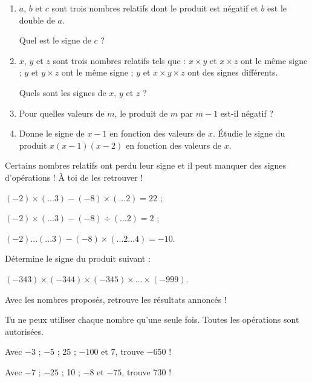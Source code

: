 \begin{enigme}
\begin{enumerate}
    \item $a$, $b$ et $c$ sont trois nombres relatifs dont le produit est négatif et $b$ est le double de $a$.
    
    Quel est le signe de $c$ ?
    \item $x$, $y$ et $z$ sont trois nombres relatifs tels que :
		$x \times y$ et $x \times z$ ont le même signe ;
		$y$ et $y \times z$ ont le même signe ;
		$y$ et $x \times y \times z$ ont des signes différents.
		
	Quels sont les signes de $x$, $y$ et $z$ ?
	\item Pour quelles valeurs de $m$, le produit de $m$ par $m -1$ est-il négatif ?
	\item Donne le signe de $x -1$ en fonction des valeurs de $x$.
Étudie le signe du produit $x(x -1)(x -2)$ en fonction des valeurs de $x$.
\end{enumerate}
\end{enigme}

\vspace{2em}

\begin{enigme}
Certains nombres relatifs ont perdu leur signe et il peut manquer des signes d'opérations ! À toi de les retrouver !

$(-2) \times (... 3) -(-8) \times (... 2) = 22$ ;

$(-2) \times (... 3) -(-8) \div (... 2) = 2$ ;

$(-2) ... (... 3) -(-8) \times (... 2 ... 4) = -10$.
\end{enigme}


\vspace{2em}

\begin{enigme}
Détermine le signe du produit suivant :

$(-343) \times (-344) \times (-345) \times ... \times (-999)$.
\end{enigme}



\vspace{2em}

\begin{enigme}
Avec les nombres proposés, retrouve les résultats annoncés !

Tu ne peux utiliser chaque nombre qu'une seule fois. Toutes les opérations sont autorisées.

Avec $-3$ ; $-5$ ; 25 ; $-100$ et 7, trouve $-650$ !

Avec $-7$ ; $-25$ ; 10 ; $-8$ et $-75$, trouve 730 !
\end{enigme}


